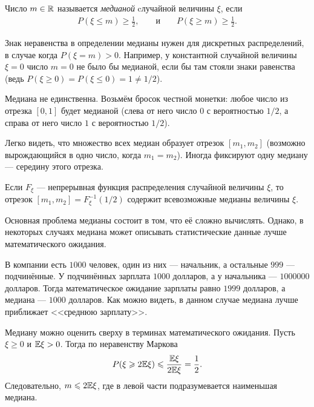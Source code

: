 \documentclass[../main.tex]{subfiles}
\begin{document}
\begin{df}
 Число $ m \in\mathbb{R}$ называется \textit{медианой} cлучайной величины $ \xi $, если
 \begin{align*}
  P(\xi \leqslant m) \geqslant \frac{1}{2}, & &\text{ и } & &P(\xi \geqslant m) \geqslant \frac{1}{2}.
 \end{align*} 
\end{df}
\begin{remrk*}
 Знак неравенства в определении медианы нужен для дискретных распределений, в случае когда $ P(\xi = m) > 0 $. Например, у константной случайной величины $ \xi = 0 $ число $ m = 0 $ не было бы медианой, если бы там стояли знаки равенства (ведь $ P(\xi \geqslant 0) = P(\xi \leqslant 0) = 1 \neq 1 / 2$).
\end{remrk*}
\begin{remrk*}
 Медиана не единственна. Возьмём бросок честной монетки: любое число из отрезка $ [0,1] $ будет медианой (слева от него число $ 0 $ с вероятностью $ 1 / 2 $, а справа от него число $ 1 $ с вероятностью $ 1 / 2 $). 
\end{remrk*}
\begin{remrk*}
 Легко видеть, что множество всех медиан образует отрезок $ [m_1,m_2] $ (возможно вырождающийся в одно число, когда $ m_1 = m_2 $). Иногда фиксируют одну медиану --- середину этого отрезка.
\end{remrk*}

\begin{remrk*}
 Если $ F_\xi $ --- непрерывная функция распределения случайной величины $ \xi $, то отрезок $ [m_1,m_2] = F_\xi^{-1}(1/2) $ содержит всевозможные медианы величины $ \xi $.
\end{remrk*}

Основная проблема медианы состоит в том, что её сложно вычислять. Однако, в некоторых случаях медиана может описывать статистические данные лучше математического ожидания.

\begin{exmpl*}
 В компании есть $ 1000 $ человек, один из них --- начальник, а остальные $ 999 $ --- подчинённые. У подчинённых зарплата $ 1000 $ долларов, а у начальника --- $ 1000000 $ долларов. Тогда математическое ожидание зарплаты равно $ 1999 $ долларов, а медиана --- $ 1000 $ долларов. Как можно видеть, в данном случае медиана лучше приближает <<среднюю зарплату>>.
\end{exmpl*}

\begin{remrk*}
 Медиану можно оценить сверху в терминах математического ожидания. Пусть $ \xi \geqslant 0 $ и $ \mathbb E\xi > 0 $. Тогда по неравенству Маркова
 \begin{align*}
  P(\xi \geqslant 2\mathbb E\xi) \leqslant \frac{\mathbb E\xi}{2\mathbb E\xi} = \frac{1}{2}.
 \end{align*} Следовательно, $ m \leqslant 2\mathbb E\xi $, где в левой части подразумевается наименьшая медиана.
\end{remrk*}
\end{document}
